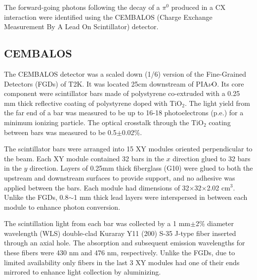 The forward-going photons following the decay of a $\pi^0$ produced in a CX interaction were identified using the CEMBALOS (Charge Exchange Measurement By A Lead On Scintillator) detector.

\subsection{CEMBALOS}
The CEMBALOS detector was a scaled down (1/6) version of the Fine-Grained Detectors (FGDs) \cite{fgd} of T2K. It was located 25cm downstream of PIA$\nu$O. Its core component were scintillator bars made of polystyrene co-extruded with a 0.25 mm thick reflective coating of polystyrene doped with TiO$_2$. The light yield from the far end of a bar was measured to be up to 16-18 photoelectrons (p.e.) for a minimum ionizing particle. The optical crosstalk through the TiO$_2$ coating between bars was measured to be 0.5$\pm$0.02\%. 

The scintillator bars were arranged into 15 XY modules oriented perpendicular to the beam. Each XY module contained 32 bars in the $x$ direction glued to 32 bars in the $y$ direction. Layers of 0.25mm thick fiberglass (G10) were glued to both the upstream and downstream surfaces to provide support, and no adhesive was applied between the bars. Each module had dimensions of 32$\times$32$\times$2.02 cm$^3$. Unlike the FGDs, 0.8$\sim$1 mm thick lead layers were interspersed in between each module to enhance photon conversion. 


The scintillation light from each bar was collected by a 1 mm$\pm$2\% diameter wavelength (WLS) double-clad Kuraray Y11 (200) S-35 J-type fiber inserted through an axial hole. The absorption and subsequent emission wavelengths for these fibers were 430 nm and 476 nm, respectively. Unlike the FGDs, due to limited availability only fibers in the last 3 XY modules had one of their ends mirrored to enhance light collection by aluminizing.

